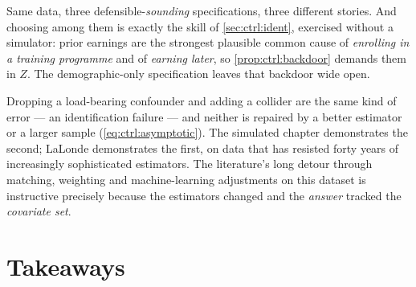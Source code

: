 Same data, three defensible-\emph{sounding} specifications, three different stories. And choosing
among them is exactly the skill of \cref{sec:ctrl:ident}, exercised without a simulator: prior
earnings are the strongest plausible common cause of \emph{enrolling in a training programme} and
of \emph{earning later}, so \cref{prop:ctrl:backdoor} demands them in $Z$. The demographic-only
specification leaves that backdoor wide open.

\begin{remark}
Dropping a load-bearing confounder and adding a collider are the same kind of error --- an
identification failure --- and neither is repaired by a better estimator or a larger sample
(\cref{eq:ctrl:asymptotic}). The simulated chapter demonstrates the second; LaLonde demonstrates
the first, on data that has resisted forty years of increasingly sophisticated estimators. The
literature's long detour through matching, weighting and machine-learning adjustments on this
dataset is instructive precisely because the estimators changed and the \emph{answer} tracked the
\emph{covariate set}.
\end{remark}

\section{Takeaways}
\label{sec:ctrl:take}


